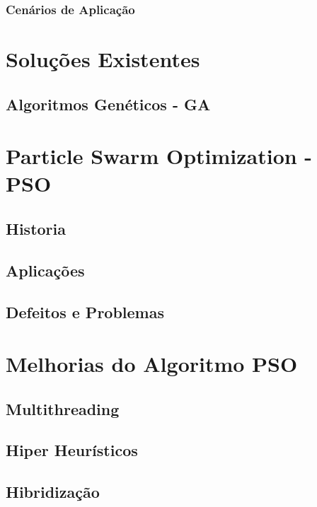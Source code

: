 \subsubsection{Cenários de Aplicação}
\lipsum[3]

\section{Soluções Existentes}
\lipsum[3]

\subsection{Algoritmos Genéticos - GA}
\lipsum[2]



\section{Particle Swarm Optimization - PSO}
\lipsum[4]

\subsection{Historia}
\lipsum[2]

\subsection{Aplicações}
\lipsum[3]

\subsection{Defeitos e Problemas}
\lipsum[2]

\section{Melhorias do Algoritmo PSO}
\lipsum[2]

\subsection{Multithreading}
\lipsum[2]

\subsection{Hiper Heurísticos}
\lipsum[2]

\subsection{Hibridização}
\lipsum[2]





